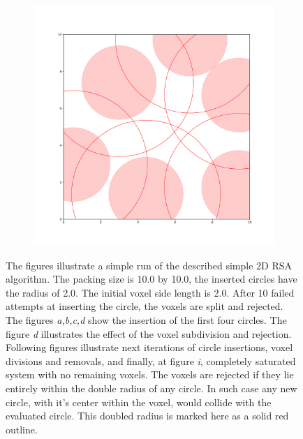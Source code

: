 \documentclass[12pt, oneside]{report}
\begin{document}
\begin{figure}[H]
\begin{subfigure}[b]{0.3\linewidth}
    \caption{}
  \end{subfigure}
  \begin{subfigure}[b]{0.3\linewidth}
    \includegraphics[width=\linewidth]{Images/2dCircleRSA/fig9.pdf}
    \caption{}
  \end{subfigure}

  \caption{The figures illustrate a simple run of the described simple 2D RSA algorithm. \newline
		The packing size is 10.0 by 10.0, the inserted circles have the radius of 2.0. The initial voxel side length is 2.0. After 10 failed attempts at inserting the circle, the voxels are split and rejected.\newline
		The figures \textit{a,b,c,d} show the insertion of the first four circles. The figure \textit{d} illustrates the effect of the voxel subdivision and rejection. Following figures illustrate next iterations of circle insertions, voxel divisions and removals, and finally, at figure \textit{i}, completely saturated system with no remaining voxels. \newline
		The voxels are rejected if they lie entirely within the double radius of any circle. In such case any new circle, with it's center within the voxel, would collide with the evaluated circle. This doubled radius is marked here as a solid red outline.}
  \label{VoxelCircleRSApdfExamples}
\end{figure}
\end{document}
